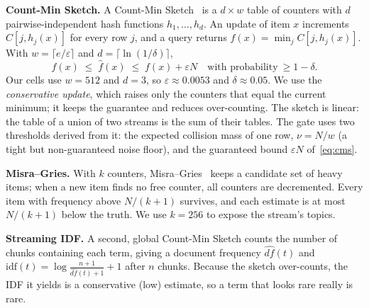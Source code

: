 \documentclass[conference,10pt]{IEEEtran}
\begin{document}
\textbf{Count-Min Sketch.} A Count-Min Sketch~\cite{cormode2005countmin} is a $d\times w$ table of counters with $d$
pairwise-independent hash functions $h_1,\dots,h_d$. An update of item $x$ increments $C[j,h_j(x)]$ for every row $j$,
and a query returns $\hat f(x)=\min_j C[j,h_j(x)]$. With $w=\lceil e/\varepsilon\rceil$ and $d=\lceil\ln(1/\delta)\rceil$,
\begin{equation}
f(x)\;\le\;\hat f(x)\;\le\;f(x)+\varepsilon N \quad\text{with probability}\ \ge 1-\delta .
\label{eq:cms}
\end{equation}
Our cells use $w{=}512$ and $d{=}3$, so $\varepsilon\approx0.0053$ and $\delta\approx0.05$. We use the
\emph{conservative update}, which raises only the counters that equal the current minimum; it keeps the guarantee and
reduces over-counting. The sketch is linear: the table of a union of two streams is the sum of their tables. The gate
uses two thresholds derived from it: the expected collision mass of one row, $\nu=N/w$ (a tight but non-guaranteed
noise floor), and the guaranteed bound $\varepsilon N$ of~\eqref{eq:cms}.

\textbf{Misra--Gries.} With $k$ counters, Misra--Gries~\cite{misra1982repeated} keeps a candidate set of heavy items;
when a new item finds no free counter, all counters are decremented. Every item with frequency above $N/(k{+}1)$
survives, and each estimate is at most $N/(k{+}1)$ below the truth. We use $k{=}256$ to expose the stream's topics.

\textbf{Streaming IDF.} A second, global Count-Min Sketch counts the number of chunks containing each term, giving a
document frequency $\widehat{df}(t)$ and $\mathrm{idf}(t)=\log\frac{n+1}{\widehat{df}(t)+1}+1$ after $n$ chunks. Because the
sketch over-counts, the IDF it yields is a conservative (low) estimate, so a term that looks rare really is rare.
\end{document}
